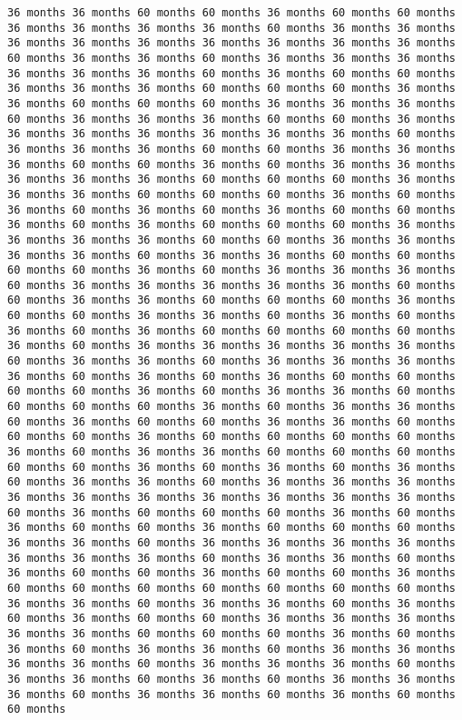 \documentclass[11pt]{article}
\begin{document}
\begin{Verbatim}[commandchars=\\\{\}, frame=single, framerule=2mm, rulecolor=\color{outerrorbackground}]
36 months 36 months 60 months 60 months 36 months 60 months 60 months 36 months 36 months 36 months 36 months 60 months 36 months 36 months 36 months 36 months 36 months 36 months 36 months 36 months 36 months 60 months 36 months 36 months 60 months 36 months 36 months 36 months 36 months 36 months 36 months 60 months 36 months 60 months 60 months 36 months 36 months 36 months 60 months 60 months 60 months 36 months 36 months 60 months 60 months 60 months 36 months 36 months 36 months 60 months 36 months 36 months 36 months 60 months 60 months 36 months 36 months 36 months 36 months 36 months 36 months 36 months 60 months 36 months 36 months 36 months 60 months 60 months 36 months 36 months 36 months 60 months 60 months 36 months 60 months 36 months 36 months 36 months 36 months 36 months 60 months 60 months 60 months 36 months 36 months 36 months 60 months 60 months 60 months 36 months 60 months 36 months 60 months 36 months 60 months 36 months 60 months 60 months 36 months 60 months 36 months 60 months 60 months 60 months 36 months 36 months 36 months 36 months 60 months 60 months 36 months 36 months 36 months 36 months 60 months 36 months 36 months 60 months 60 months 60 months 60 months 36 months 60 months 36 months 36 months 36 months 60 months 36 months 36 months 36 months 36 months 36 months 60 months 60 months 36 months 36 months 60 months 60 months 60 months 36 months 60 months 60 months 36 months 36 months 60 months 36 months 60 months 36 months 60 months 36 months 60 months 60 months 60 months 60 months 36 months 60 months 36 months 36 months 36 months 36 months 36 months 60 months 36 months 36 months 60 months 36 months 36 months 36 months 36 months 60 months 36 months 60 months 36 months 60 months 60 months 60 months 60 months 36 months 60 months 36 months 36 months 60 months 60 months 60 months 60 months 36 months 60 months 36 months 36 months 60 months 36 months 60 months 60 months 36 months 36 months 60 months 60 months 60 months 36 months 60 months 60 months 60 months 60 months 36 months 60 months 36 months 36 months 60 months 60 months 60 months 60 months 60 months 36 months 60 months 36 months 60 months 36 months 60 months 36 months 36 months 60 months 36 months 36 months 36 months 36 months 36 months 36 months 36 months 36 months 36 months 36 months 60 months 36 months 60 months 60 months 60 months 36 months 60 months 36 months 60 months 60 months 36 months 60 months 60 months 60 months 36 months 36 months 60 months 36 months 36 months 36 months 36 months 36 months 36 months 36 months 60 months 36 months 36 months 60 months 36 months 60 months 60 months 36 months 60 months 60 months 36 months 60 months 60 months 60 months 60 months 60 months 60 months 60 months 36 months 36 months 60 months 36 months 36 months 60 months 36 months 60 months 36 months 60 months 60 months 36 months 36 months 36 months 36 months 36 months 60 months 60 months 60 months 36 months 60 months 36 months 60 months 36 months 36 months 60 months 36 months 36 months 36 months 36 months 60 months 36 months 36 months 36 months 60 months 36 months 36 months 60 months 36 months 60 months 36 months 36 months 36 months 60 months 36 months 36 months 60 months 36 months 60 months 60 months 
\end{Verbatim}
\end{document}
